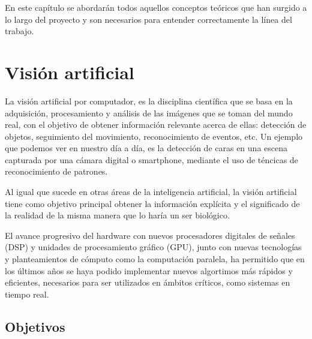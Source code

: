 
En este capítulo se abordarán todos aquellos conceptos teóricos que han surgido
a lo largo del proyecto y son necesarios para entender correctamente la línea
del trabajo.


\section{Visión artificial}
\label{2:sec:1}

La visión artificial por computador, es la disciplina científica que se basa en
la adquisición, procesamiento y análisis de las imágenes que se toman del mundo
real, con el objetivo de obtener información relevante acerca de ellas:
detección de objetos, seguimiento del movimiento, reconocimiento de eventos,
etc. Un ejemplo que podemos ver en nuestro día a día, es la detección de caras
en una escena capturada por una cámara digital o smartphone, mediante el uso de
téncicas de reconocimiento de patrones.

Al igual que sucede en otras áreas de la inteligencia artificial, la visión
artificial tiene como objetivo principal obtener la información explícita y el
significado de la realidad de la misma manera que lo haría un ser biológico.

El avance progresivo del hardware con nuevos procesadores digitales de señales
(DSP) y unidades de procesamiento gráfico (GPU), junto con nuevas tecnologías y planteamientos de cómputo como la computación paralela, ha permitido que en los
últimos años se haya podido implementar nuevos algortimos más rápidos y
eficientes, necesarios para ser utilizados en ámbitos críticos, como sistemas
en tiempo real.

\subsection{Objetivos}

